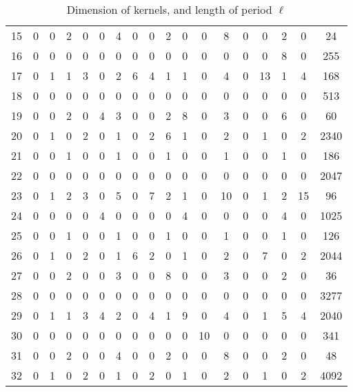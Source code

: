 \begin{table}
\begin{center}
\begin{tabular}{|c|cccccccccccccccc|c|}
15&0  &0 &2 &0 &0 &4 &0 &0 &2 &0 &0 &8 &0 &0 &2 &0 &24\\
16&0  &0 &0 &0 &0 &0 &0 &0 &0 &0 &0 &0 &0 &0 &8 &0 &255\\
17&0  &1 &1 &3 &0 &2 &6 &4 &1 &1 &0 &4 &0 &13 &1 &4 &168\\
18&0  &0 &0 &0 &0 &0 &0 &0 &0 &0 &0 &0 &0 &0 &0 &0 &513\\
19&0  &0 &2 &0 &4 &3 &0 &0 &2 &8 &0 &3 &0 &0 &6 &0 &60\\
20&0  &1 &0 &2 &0 &1 &0 &2 &6 &1 &0 &2 &0 &1 &0 &2 &2340\\
21&0  &0 &1 &0 &0 &1 &0 &0 &1 &0 &0 &1 &0 &0 &1 &0 &186\\
22&0  &0 &0 &0 &0 &0 &0 &0 &0 &0 &0 &0 &0 &0 &0 &0 &2047\\
23&0  &1 &2 &3 &0 &5 &0 &7 &2 &1 &0 &10 &0 &1 &2 &15 &96\\
24&0  &0 &0 &0 &4 &0 &0 &0 &0 &4 &0 &0 &0 &0 &4 &0 &1025\\
25&0  &0 &1 &0 &0 &1 &0 &0 &1 &0 &0 &1 &0 &0 &1 &0 &126\\
26 &0 &1 &0 &2 &0 &1 &6 &2 &0 &1 &0 &2 &0 &7 &0 &2 &2044\\
27 &0 &0 &2 &0 &0 &3 &0 &0 &8 &0 &0 &3 &0 &0 &2 &0 &36\\
28 &0 &0 &0 &0 &0 &0 &0 &0 &0 &0 &0 &0 &0 &0 &0 &0 &3277\\
29 &0 &1 &1 &3 &4 &2 &0 &4 &1 &9 &0 &4 &0 &1 &5 &4 &2040\\
30 &0 &0 &0 &0 &0 &0 &0 &0 &0 &0 &10 &0 &0 &0 &0 &0 &341\\ 
31 &0 &0 &2 &0 &0 &4 &0 &0 &2 &0 &0 &8 &0 &0 &2 &0 &48\\
32 &0 &1 &0 &2 &0 &1 &0 &2 &0 &1 &0 &2 &0 &1 &0 &2 &4092\\
      \hline
    \end{tabular}
  \end{center}
  \caption{Dimension of kernels, and length of period $\ell$}\label{kernels}
  \label{tab:n2}
\end{table}

